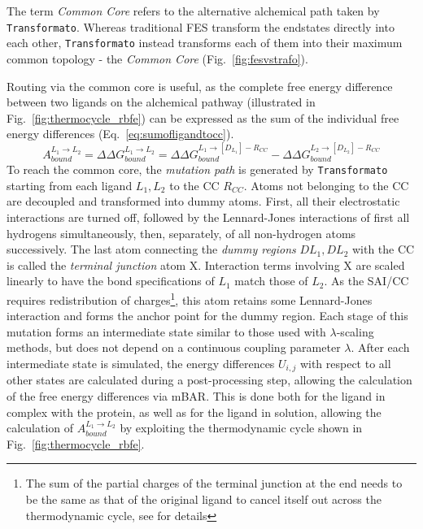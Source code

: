 \documentclass[oneside]{scrreprt}
\begin{document}
\begin{sloppypar}The term \emph{Common Core} \cite{Wieder2022Jun,braunsfeldImplementationTestingCHARMM} refers to the alternative alchemical path taken by \texttt{Transformato}. Whereas traditional FES transform the endstates directly into each other, \texttt{Transformato} instead transforms each of them into their maximum common topology - the \emph{Common Core} (Fig.~\ref{fig:fesvstrafo}). 
\end{sloppypar}

Routing via the common core is useful, as the complete free energy difference between two ligands on the alchemical pathway (illustrated in Fig.~\ref{fig:thermocycle_rbfe}) can be expressed as the sum of the individual free energy differences (Eq.~\ref{eq:sumofligandtocc}).
\begin{equation}\label{eq:sumofligandtocc}
    A^{L_1\rightarrow L_2}_{bound}=\Delta \Delta G_{bound}^{L_1\rightarrow L_2}=\Delta \Delta G^{L_1\rightarrow [D_{L_1}]-R_{CC}}_{bound}-\Delta \Delta G^{L_2\rightarrow [D_{L_2}]-R_{CC}}_{bound}
\end{equation}
To reach the common core, the \emph{mutation path} is generated by \texttt{Transformato} starting from each ligand $L_1, L_2$ to the CC $R_{CC}$. Atoms not belonging to the CC are decoupled and transformed into dummy atoms. First, all their electrostatic interactions are turned off, followed by the Lennard-Jones interactions of first all hydrogens simultaneously, then, separately, of all  non-hydrogen atoms successively. The last atom connecting the \emph{dummy regions} $DL_1,DL_2$ with the CC is called the \emph{terminal junction} atom X. Interaction terms involving X are scaled linearly to have the bond specifications of $L_1$ match those of $L_2$. As the SAI/CC requires redistribution of charges\footnote{The sum of the partial charges of the terminal junction at the end needs to be the same as that of the original ligand to cancel itself out across the thermodynamic cycle, see \cite{karwounopoulos_relative_2022,Wieder2022Jun} for details}, this atom retains some Lennard-Jones interaction and forms the anchor point for the dummy region. Each stage of this mutation forms an intermediate state similar to those used with $\lambda$-scaling methods, but does not depend on a continuous coupling parameter $\lambda$. After each intermediate state is simulated, the energy differences $U_{i,j}$ with respect to all other states are calculated during a post-processing step, allowing the calculation of the free energy differences via mBAR. This is done both for the ligand in complex with the protein, as well as for the ligand in solution, allowing the calculation of $A^{L_1\rightarrow L_2}_{bound}$ by exploiting  the thermodynamic cycle shown in Fig.~\ref{fig:thermocycle_rbfe}.
\end{document}
